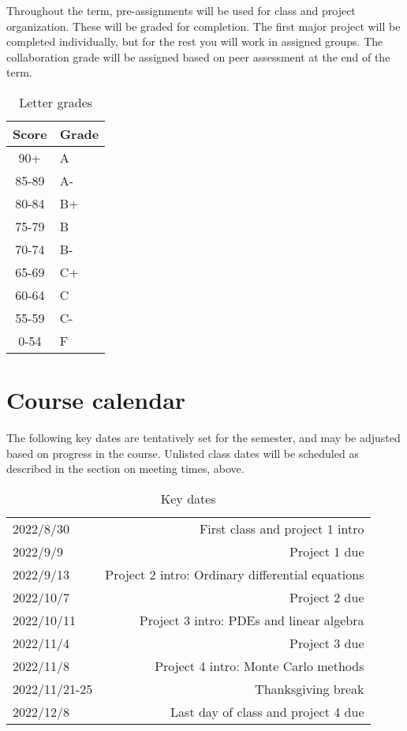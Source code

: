 \documentclass[12pt]{article}
\begin{document}
Throughout the term, pre-assignments will be used for class and project organization. These will be graded for completion. The first major project will be completed individually, but for the rest you will work in assigned groups. The collaboration grade will be assigned based on peer assessment at the end of the term.

\begin{table}[h]
  \caption{Letter grades}
\begin{center}
  \begin{tabular}{cl}
	\toprule
	Score & Grade \\
	\midrule
	90+     &         A \\
   85-89    &         A-\\
   80-84    &         B+\\
   75-79    &         B	\\
   70-74    &         B-\\
   65-69    &         C+\\
   60-64    &         C	\\
   55-59    &         C-\\
   0-54    &         F \\
   \bottomrule
  \end{tabular}
\end{center}
\end{table}
\newpage
\section*{Course calendar}

The following key dates are tentatively set for the semester, and may be adjusted based on progress in the course. Unlisted class dates will be scheduled as described in the section on meeting times, above.
\begin{table}[h]
  \caption{Key dates}
\begin{center}
  \begin{tabular}{lr}
    \toprule
    2022/8/30 & First class and project 1 intro \\
    2022/9/9 & Project 1 due \\
    2022/9/13 & Project 2 intro: Ordinary differential equations \\
    2022/10/7 & Project 2 due \\
    2022/10/11 & Project 3 intro: PDEs and linear algebra \\
    2022/11/4 & Project 3 due \\
    2022/11/8 & Project 4 intro: Monte Carlo methods \\
    2022/11/21-25 & Thanksgiving break \\
    2022/12/8 & Last day of class and project 4 due \\
    \bottomrule
  \end{tabular}
\end{center}
\end{table}
\end{document}
